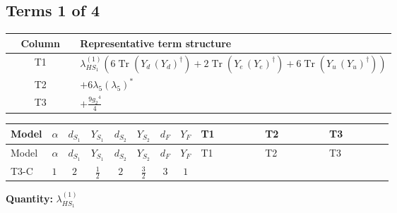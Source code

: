 \documentclass[8pt]{article}
\begin{document}
\begin{landscape}
\subsection*{Terms 1 of 4}
\begin{center}
\begin{tabular}{@{}c >{\raggedright\arraybackslash}p{0.82\linewidth}@{}}
\toprule
Column & Representative term structure \\
\midrule
T1 & \(\displaystyle {\lambda_{HS_1}^{(1)}} (6 \operatorname{Tr}\!\left({Y_d}\,\left({Y_d}\right)^{\dagger}\right)+2 \operatorname{Tr}\!\left({Y_e}\,\left({Y_e}\right)^{\dagger}\right)+6 \operatorname{Tr}\!\left({Y_u}\,\left({Y_u}\right)^{\dagger}\right))\) \\
\midrule
T2 & \(\displaystyle +6 {\lambda_5} \left({\lambda_5}\right)^{*}\) \\
\midrule
T3 & \(\displaystyle +\frac{9 {g_2}^4}{4}\) \\
\midrule
\bottomrule
\end{tabular}
\end{center}
\smallskip
\tiny
\begin{longtable}{@{}llcccccc >{\raggedright\arraybackslash}p{0.21\linewidth} >{\raggedright\arraybackslash}p{0.21\linewidth} >{\raggedright\arraybackslash}p{0.21\linewidth}@{}}
\toprule
Model & $\alpha$ & $d_{S_1}$ & $Y_{S_1}$ & $d_{S_2}$ & $Y_{S_2}$ & $d_F$ & $Y_F$ & T1 & T2 & T3 \\
\midrule
\endfirsthead
\toprule
Model & $\alpha$ & $d_{S_1}$ & $Y_{S_1}$ & $d_{S_2}$ & $Y_{S_2}$ & $d_F$ & $Y_F$ & T1 & T2 & T3 \\
\midrule
\endhead
T3-C & $1$ & $2$ & $\frac{1}{2}$ & $2$ & $\frac{3}{2}$ & $3$ & $1$ & \scriptsize\adjustbox{max width=\linewidth}{$\begin{gathered} {\lambda_{HS_1}^{(1)}} (6 \operatorname{Tr}\!\left({Y_d}\,\left({Y_d}\right)^{\dagger}\right)+2 \operatorname{Tr}\!\left({Y_e}\,\left({Y_e}\right)^{\dagger}\right)+6 \operatorname{Tr}\!\left({Y_u}\,\left({Y_u}\right)^{\dagger}\right))\end{gathered}$} & \scriptsize\adjustbox{max width=\linewidth}{$\begin{gathered} +6 {\lambda_5} \left({\lambda_5}\right)^{*}\end{gathered}$} & \scriptsize\adjustbox{max width=\linewidth}{$\begin{gathered} +\frac{9 {g_2}^4}{4}\end{gathered}$} \\
\midrule
\bottomrule
\end{longtable}
\clearpage
\noindent\textbf{Quantity: }$\lambda_{HS_1}^{(1)}$\par\smallskip

\end{landscape}
\end{document}
